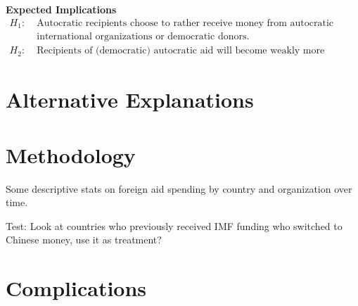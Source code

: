 \documentclass{article}
\begin{document}
\textbf{Expected Implications} 
\begin{align*}
    H_1:\; &\text{Autocratic recipients choose to rather receive money from autocratic donors than}\\
    &\text{international organizations or democratic donors.}\\
    H_2:\; &\text{Recipients of (democratic) autocratic aid will become weakly more (democratic) autocratic.}
\end{align*}

\section*{Alternative Explanations}

\section*{Methodology}
Some descriptive stats on foreign aid spending by country and organization over time. 

Test: Look at countries who previously received IMF funding who switched to Chinese money, use it as treatment?

\section*{Complications}

\printbibliography
\end{document}
